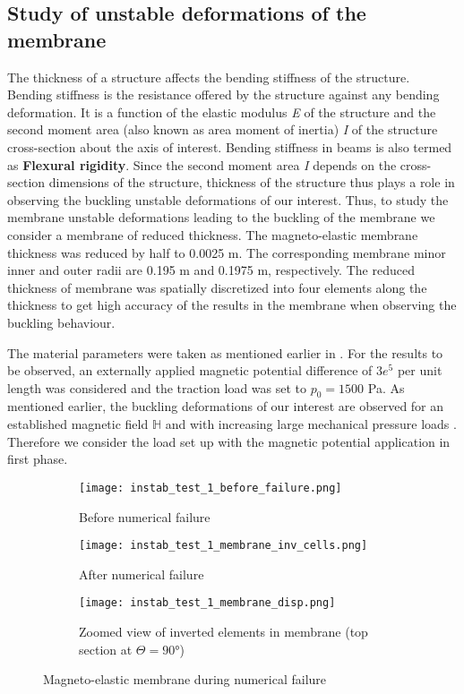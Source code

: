 \subsection{Study of unstable deformations of the membrane}

The thickness of a structure affects the bending stiffness of the structure. Bending stiffness is the resistance offered by the structure against any bending deformation. It is a function of the elastic modulus \textit{E} of the structure and the second moment area (also known as area moment of inertia) \textit{I} of the structure cross-section about the axis of interest. Bending stiffness in beams is also termed as \textbf{Flexural rigidity}. Since the second moment area \textit{I} depends on the cross-section dimensions of the structure, thickness of the structure thus plays a role in observing the buckling unstable deformations of our interest. Thus, to study the membrane unstable deformations leading to the buckling of the membrane we consider a membrane of reduced thickness. The magneto-elastic membrane thickness was reduced by half to 0.0025 m. The corresponding membrane minor inner and outer radii are 0.195 m and 0.1975 m, respectively. The reduced thickness of membrane was spatially discretized into four elements along the thickness to get high accuracy of the results in the membrane when observing the buckling behaviour.  \par 

The material parameters were taken as mentioned earlier in . For the results to be observed, an externally applied magnetic potential difference of $3e^5$ per unit length was considered and the traction load was set to $p_0 = 1500$ Pa. As mentioned earlier, the buckling deformations of our interest are observed for an established magnetic field $\mathbb{H}$ and with increasing large mechanical pressure loads \cite{reddy_toroid,Reddy2018}. Therefore we consider the load set up with the magnetic potential application in first phase. \par 


\begin{figure}[h]
\centering
\begin{subfigure}{0.3\textwidth}
\centering
\texttt{[image: instab\_test\_1\_before\_failure.png]}
\caption{Before numerical failure}
\label{fig:3.16.1}
\end{subfigure}
\begin{subfigure}{0.3\textwidth}
\centering
\texttt{[image: instab\_test\_1\_membrane\_inv\_cells.png]}
\caption{After numerical failure}
\label{fig:3.16.2}
\end{subfigure}
\begin{subfigure}{0.38\textwidth}
\centering
\texttt{[image: instab\_test\_1\_membrane\_disp.png]}
\caption{Zoomed view of inverted elements in membrane (top section at $\Theta = \ang{90}$)}
\label{fig:3.16.3}
\end{subfigure}
\caption{Magneto-elastic membrane during numerical failure}
\label{fig:3.16}
\end{figure}

